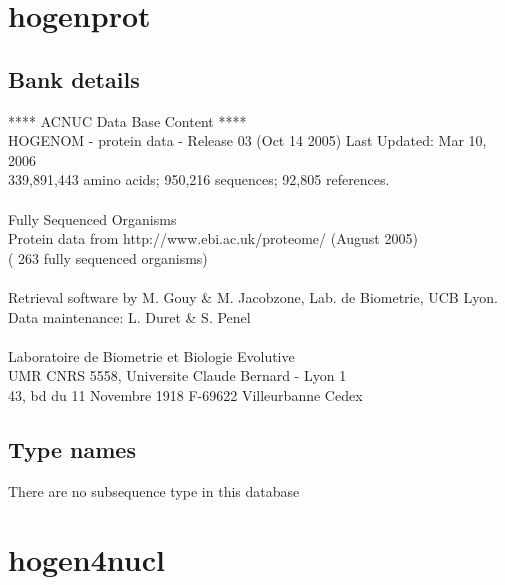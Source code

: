 \documentclass{article}
\begin{document}
\begin{Schunk}
\section{ hogenprot }
\subsection{Bank details}
               ****     ACNUC Data Base Content      ****                      \\
  HOGENOM - protein data - Release 03 (Oct 14 2005) Last Updated: Mar 10, 2006\\
          339,891,443 amino acids; 950,216 sequences; 92,805 references.\\
                                                                               \\
                        Fully Sequenced Organisms\\
   Protein data from http://www.ebi.ac.uk/proteome/ (August 2005)\\
	            ( 263 fully sequenced organisms)\\
\\
Retrieval software by M. Gouy \& M. Jacobzone, Lab. de Biometrie, UCB Lyon.\\
Data maintenance: L. Duret \& S. Penel\\
\\
Laboratoire de Biometrie et Biologie Evolutive\\
UMR CNRS 5558, Universite Claude Bernard - Lyon 1 \\
43, bd du 11 Novembre 1918 F-69622 Villeurbanne Cedex\\


\subsection{Type names}
There are no subsequence type in this database
\section{ hogen4nucl }

\end{Schunk}
\end{document}
